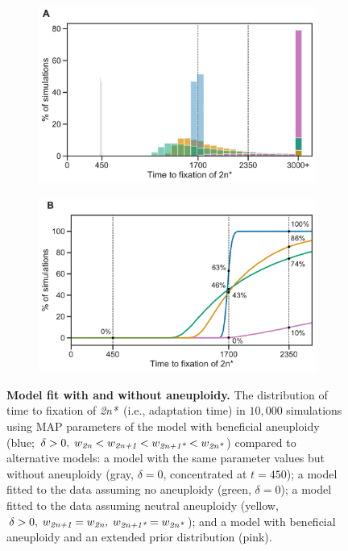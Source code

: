 \documentclass[12pt]{extarticle}
\newcommand{\euwt}{\emph{2n}}
\newcommand{\anwt}{\emph{2n+1}}
\newcommand{\eumt}{\emph{2n*}}
\newcommand{\anmt}{\emph{2n+1*}}
\begin{document}
\begin{figure}[h!]
  \begin{subfigure}{0.5\textwidth}
      \centering
      \includegraphics[width=\textwidth]{../figures/fixation-plot-a.pdf}      
      \label{fig:fit}
  \end{subfigure}
  \begin{subfigure}{0.5\textwidth}
      \centering
      \includegraphics[width=\textwidth]{../figures/fixation-plot-b.pdf}      
      \label{fig:fit-cumulative}
  \end{subfigure}
  \caption{
    \textbf{Model fit with and without aneuploidy.}
    The distribution of time to fixation of \eumt\ (i.e., adaptation time) in $10,000$ simulations using MAP parameters of the model with beneficial aneuploidy (blue; $\delta>0, \; w_{\euwt}<w_{\anwt}<w_{\anmt}<w_{\eumt}$) compared to alternative models: a model with the same parameter values but without aneuploidy (gray, $\delta=0$, concentrated at $t=450$); a model fitted to the data assuming no aneuploidy (green, $\delta=0$); a model fitted to the data assuming neutral aneuploidy (yellow, $\delta>0, \; w_{\anwt}=w_{\euwt}, \; w_{\anmt}=w_{\eumt}$); and a model with beneficial aneuploidy and an extended prior distribution (pink).
}
\end{figure}
\end{document}
